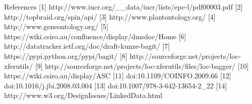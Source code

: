 \documentclass{llncs}
\begin{document}



References
[1] http://www.iucr.org/\_\_data/iucr/lists/epc-l/pdf00003.pdf
[2] http://topbraid.org/spin/api/
[3] http://www.plantontology.org/
[4] http://www.geneontology.org/
[5] https://wiki.csiro.au/confluence/display/dmsdoc/Home
[6] http://datatracker.ietf.org/doc/draft-kunze-bagit/
[7] https://pypi.python.org/pypi/bagit/
[8] http://sourceforge.net/projects/loc-xferutils/
[9] http://sourceforge.net/projects/loc-xferutils/files/loc-bagger/
[10] https://wiki.csiro.au/display/ASC
[11] doi:10.1109/COINFO.2009.66 
[12] doi:10.1016/j.jbi.2008.03.004
[13] doi:10.1007/978-3-642-13654-2\_22
[14] http://www.w3.org/DesignIssues/LinkedData.html
\end{document}
